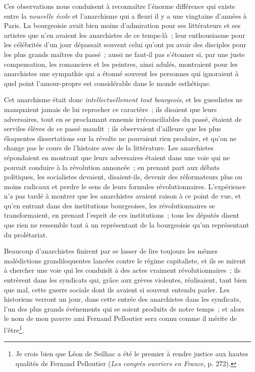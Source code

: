 \documentclass[french,twoside]{book} %
\begin{document}
\noindent Ces observations nous conduisent à reconnaître l’énorme différence qui existe entre la \emph{nouvelle école} et l’anarchisme qui a fleuri il y a une vingtaine d’années à Paris. La bourgeoisie avait bien moins d’admiration pour ses littérateurs et ses artistes que n’en avaient les anarchistes de ce temps-là ; leur enthousiasme pour les célébrités d’un jour dépassait souvent celui qu’ont pu avoir des disciples pour les plus grands maîtres du passé ; aussi ne faut-il pas s’étonner si, par une juste compensation, les romanciers et les peintres, ainsi adulés, montraient pour les anarchistes une sympathie qui a étonné souvent les personnes qui ignoraient à quel point l’amour-propre est considérable dans le monde esthétique.\par
Cet anarchisme était donc \emph{intellectuellement tout bourgeois,} et les guesdistes ne manquaient jamais de lui reprocher ce caractère ; ils disaient que leurs adversaires, tout en se proclamant ennemis irréconciliables du passé, étaient de serviles élèves de ce passé maudit ; ils observaient  d’ailleurs que les plus éloquentes dissertations sur la révolte ne pouvaient rien produire, et qu’on ne change pas le cours de l’histoire avec de la littérature. Les anarchistes répondaient en montrant que leurs adversaires étaient dans une voie qui ne pouvait conduire à la révolution annoncée ; en prenant part aux débats politiques, les socialistes devaient, disaient-ils, devenir des réformateurs plus ou moins radicaux et perdre le sens de leurs formules révolutionnaires. L’expérience n’a pas tardé à montrer que les anarchistes avaient raison à ce point de vue, et qu’en entrant dans des institutions bourgeoises, les révolutionnaires se transformaient, en prenant l’esprit de ces institutions ; tous les députés disent que rien ne ressemble tant à un représentant de la bourgeoisie qu’un représentant du prolétariat.\par
Beaucoup d’anarchistes finirent par se lasser de lire toujours les mêmes malédictions grandiloquentes lancées contre le régime capitaliste, et ils se mirent à chercher une voie qui les conduisît à des actes vraiment révolutionnaires ; ils entrèrent dans les syndicats qui, grâce aux grèves violentes, réalisaient, tant bien que mal, cette guerre sociale dont ils avaient si souvent entendu parler. Les historiens verront un jour, dans cette entrée des anarchistes dans les syndicats, l’un des plus grands événements qui se soient produits de notre temps ; et alors le nom de mon pauvre ami Fernand Pelloutier sera connu comme il mérite de l’être\footnote{ \noindent Je crois bien que Léon de Seilhac a été le premier à rendre justice aux hautes qualités de Fernand Pelloutier (\emph{Les congrès ouvriers en France}, p. 272).
 }.\par
\end{document}
